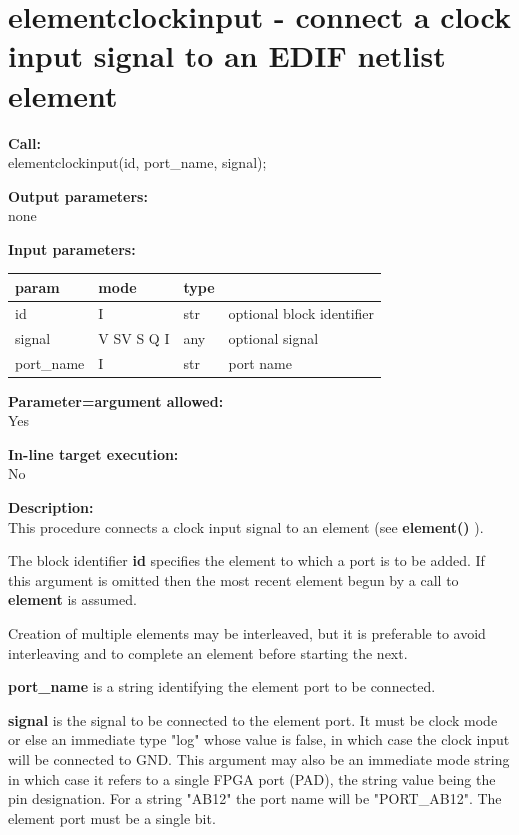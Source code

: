     \section{elementclockinput - connect a clock input signal to an EDIF netlist element}\label{sec:ipelmntinclk}
        
        {\bf Call:} \\
        elementclockinput(id, port\_name, signal);
        
        {\bf Output parameters:} \\
        none
        
        {\bf Input parameters:} \\
        \begin{tabular}{| l | l | l | l |}
        \hline
        param  & mode     & type  & \\
        \hline \hline
        id          & I          & str & optional block identifier \\ \hline
        signal      & V SV S Q I & any & optional signal           \\ \hline
        port\_name  & I          & str & port name                 \\ \hline
        \end{tabular}
        
        {\bf Parameter=argument allowed:} \\
        Yes
        
        {\bf In-line target execution:} \\
        No
        
        {\bf Description:} \\
        This procedure connects a clock input signal to an element (see {\bf
        element()} ).

        The block identifier {\bf id} specifies the element to which a port is
        to be added. If this argument is omitted then the most recent element
        begun by a call to {\bf element} is assumed.

        Creation of multiple elements may be interleaved, but it is preferable
        to avoid interleaving and to complete an element before starting the
        next.

        {\bf port\_name} is a string identifying the element port to be
        connected.

        {\bf signal} is the signal to be connected to the element port. It must
        be clock mode or else an immediate type "log" whose value is false, in
        which case the clock input will be connected to GND. This argument may
        also be an immediate mode string in which case it refers to a single
        FPGA port (PAD), the string value being the pin designation. For a
        string "AB12" the port name will be "PORT\_AB12". The element port must
        be a single bit.


